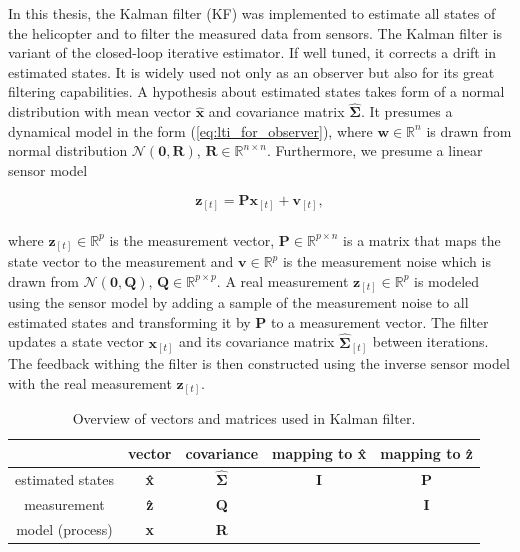 In this thesis, the Kalman filter (KF) was implemented to estimate all states of the helicopter and to filter the measured data from sensors. The Kalman filter is variant of the closed-loop iterative estimator. If well tuned, it corrects a drift in estimated states. It is widely used not only as an observer but also for its great filtering capabilities. A hypothesis about estimated states takes form of a normal distribution with mean vector $\hat{\textbf{x}}$ and covariance matrix $\hat{\boldsymbol{\Sigma}}$. It presumes a dynamical model in the form (\ref{eq:lti_for_observer}), where $\textbf{w} \in \mathbb{R}^n$ is drawn from normal distribution $\mathcal{N}(\textbf{0}, \textbf{R})$, $\textbf{R} \in \mathbb{R}^{n\times n}$. Furthermore, we presume a linear sensor model

\begin{equation}
\textbf{\^z}_{[t]} = \textbf{P}\textbf{\^x}_{[t]} + \textbf{v}_{[t]},
\end{equation}
\\
where $\textbf{\^z}_{[t]} \in \mathbb{R}^p$ is the measurement vector, $\textbf{P} \in \mathbb{R}^{p \times n}$ is a matrix that maps the state vector to the measurement and $\textbf{v} \in \mathbb{R}^p$ is the measurement noise which is drawn from $\mathcal{N}(\textbf{0}, \textbf{Q})$, $\textbf{Q} \in \mathbb{R}^{p \times p}$. A real measurement $\textbf{z}_{[t]} \in \mathbb{R}^p$ is modeled using the sensor model by adding a sample of the measurement noise to all estimated states and transforming it by \textbf{P} to a measurement vector. The filter updates a state vector $\textbf{\^x}_{[t]}$ and its covariance matrix $\hat{\boldsymbol{\Sigma}}_{[t]}$ between iterations. The feedback withing the filter is then constructed using the inverse sensor model with the real measurement $\textbf{z}_{[t]}$.

\begin{table}[h]
\centering
\begin{tabular}{ccccc}
\hline
& vector & covariance & mapping to \textbf{\^x} & mapping to \textbf{\^z}\\
\hline
estimated states & \textbf{\^x} & $\hat{\boldsymbol{\Sigma}}$ & \textbf{I} & \textbf{P}\\
measurement & \textbf{\^z} & \textbf{Q} & & \textbf{I}\\
model (process) & \textbf{x} & \textbf{R} & & \\
\hline
\end{tabular}
\caption{Overview of vectors and matrices used in Kalman filter.}
\label{tab:matrices_in_kalman}
\end{table}


